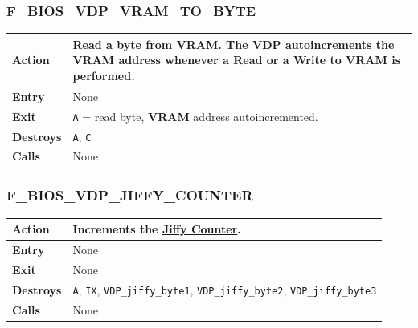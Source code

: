 \documentclass[a4paper,11pt]{article}
\begin{document}
        \subsubsection{F\_BIOS\_VDP\_VRAM\_TO\_BYTE}
        \label{func:fbiosvdpvramtobyte}
        \begin{tabular}{l p{9cm}}
            \hline\textbf{Action}
            & Read a byte from \textbf{VRAM}. The \textbf{VDP} autoincrements
            the \textbf{VRAM} address whenever a Read or a Write to
            \textbf{VRAM} is performed.\\
            \hline\textbf{Entry} & None\\
            \hline\textbf{Exit} & \texttt{A} = read byte, \textbf{VRAM} address
            autoincremented.\\
            \hline\textbf{Destroys} & \texttt{A}, \texttt{C} \\
            \hline\textbf{Calls} & None\\
            \hline
        \end{tabular}

        \subsubsection{F\_BIOS\_VDP\_JIFFY\_COUNTER}
        \label{func:fbiosvdpjiffycounter}
        \begin{tabular}{l p{9cm}}
            \hline\textbf{Action}
            & Increments the \hyperref[subsec:jiffy_counter]{Jiffy Counter}.\\
            \hline\textbf{Entry} & None\\
            \hline\textbf{Exit} & None\\
            \hline\textbf{Destroys} & \texttt{A}, \texttt{IX},
            \texttt{VDP\_jiffy\_byte1}, \texttt{VDP\_jiffy\_byte2},
            \texttt{VDP\_jiffy\_byte3}\\
            \hline\textbf{Calls} & None\\
            \hline
        \end{tabular}

\end{document}
